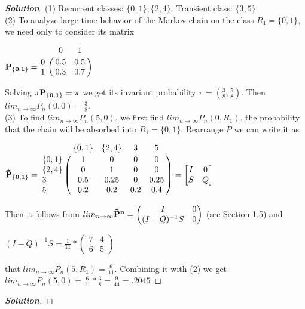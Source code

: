 \documentclass[12pt]{book}
\newenvironment{problem}[2][Problem]{\begin{trivlist}
\item[\hskip \labelsep {\bfseries #1}\hskip \labelsep {\bfseries #2.}]}{\end{trivlist}}
\newenvironment{solution}
               {\let\oldqedsymbol=\qedsymbol
                \renewcommand{\qedsymbol}{$\square$}
                \begin{proof}[\bfseries\upshape Solution]}
               {\end{proof}
                \renewcommand{\qedsymbol}{\oldqedsymbol}}
\begin{document}
\begin{problem}{1.5}
\end{problem}
\begin{solution}
(1) Recurrent classes: $\{0,1\}, \{2,4\}$. Transient class: $\{3,5\}$ \\
(2) To analyze large time behavior of the Markov chain on the class $R_{1} = \{0,1\}$, we need only to consider its matrix 
\begin{center}
$ \bf{P}_{\{0,1\}} = 
    \bordermatrix{ & 0 & 1 \cr
      0 & 0.5 & 0.5 \cr
      1 & 0.3 & 0.7 } \qquad
      $
\end{center}
Solving $\pi \bf{P}_{\{0,1\}} = \pi$ we get its invariant probability $\pi = (\frac{3}{8}, \frac{5}{8})$. Then $lim_{n \to \infty} P_{n}(0,0) = \frac{3}{8}$. \\

(3) To find $lim_{n \to \infty} P_{n}(5,0)$, we first find $lim_{n \to \infty} P_{n}(0,R_{1})$, the probability that the chain will be absorbed into $R_{1} = \{0,1\}$. Rearrange $P$ we can write it as 
\begin{center}
$ \bf{\tilde{P}}_{\{0,1\}} = 
    \bordermatrix{ & \{0,1\} & \{2,4\} & 3 & 5 \cr
      \{0,1\} & 1 & 0 & 0 & 0 \cr
      \{2,4\} & 0 & 1 & 0 & 0 \cr
      3 & 0.5 & 0.25 & 0 & 0.25 \cr
      5 & 0.2 & 0.2 & 0.2 & 0.4}  = \begin{bmatrix}
    I & 0 \\
    S & Q 
\end{bmatrix} $
      

      
\end{center}
Then it follows from $lim_{n \to \infty} \bf{\tilde{P}}^{n} = \begin{pmatrix} I & 0 \\ (I - Q)^{-1}S & 0 \end{pmatrix}$ (see Section 1.5) and 
\begin{center}
$(I - Q)^{-1}S = \frac{1}{11} * \begin{pmatrix} 7 & 4 \\ 6 & 5 \end{pmatrix}$ 
\end{center}
that $lim_{n \to \infty} P_{n}(5, R_{1}) = \frac{6}{11}$. Combining it with (2) we get $lim_{n \to \infty} P_{n}(5,0) = \frac{6}{11}* \frac{3}{8} = \frac{9}{44} = .2045$
\end{solution}


\begin{problem}{1.6}
\end{problem}
\begin{solution}
\end{solution}
\end{document}
